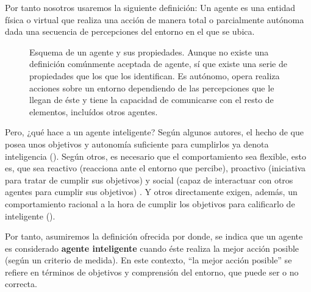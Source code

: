 Por tanto nosotros usaremos la siguiente definición: Un agente es una entidad física o virtual que realiza una acción de manera total o parcialmente autónoma dada una secuencia de percepciones del entorno en el que se ubica.

\begin{figure}
	\caption{Esquema de un agente y sus propiedades. Aunque no existe una definición comúnmente aceptada de agente, sí que existe una serie de propiedades que los que los identifican. Es autónomo, opera realiza acciones sobre un entorno dependiendo de las percepciones que le llegan de éste y tiene la capacidad de comunicarse con el resto de elementos, incluídos otros agentes.}
	\label{fig:agent-properties}
\end{figure}

Pero, ¿qué hace a un agente inteligente? Según algunos autores, el hecho de que posea unos objetivos y autonomía suficiente para cumplirlos ya denota inteligencia (). Según otros, es necesario que el comportamiento sea flexible, esto es, que sea reactivo (reacciona ante el entorno que percibe), proactivo (iniciativa para tratar de cumplir sus objetivos) y social (capaz de interactuar con otros agentes para cumplir sus objetivos) \cite{Wooldridge1995}. Y otros directamente exigen, además, un comportamiento racional a la hora de cumplir los objetivos para calificarlo de inteligente ().

Por tanto, asumiremos la definición ofrecida por \cite{russell2003artificial} donde, se indica que un agente es considerado \textbf{agente inteligente} cuando éste realiza la mejor acción posible (según un criterio de medida). En este contexto, \enquote{la mejor acción posible} se refiere en términos de objetivos y comprensión del entorno, que puede ser o no correcta.

